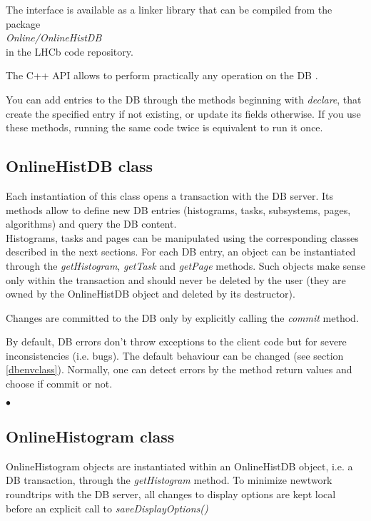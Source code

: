\documentclass{lhcbnote}
\begin{document}
The interface is available as a linker library that can be compiled from
the package \\
{\it Online/OnlineHistDB} \\
in the LHCb code repository.

The C++ API allows to perform practically any operation on the DB .

You can add entries to the DB through the methods beginning with {\it
declare}, that create the specified entry if not existing, or 
update its fields otherwise. If you use these methods, running the
same code twice is equivalent to run it once.


\subsection{OnlineHistDB class}
Each instantiation of this class opens a transaction with the DB
server. Its methods allow to define new DB entries (histograms,
tasks, subsystems, pages, algorithms) and query the DB content. \\
Histograms, tasks and pages can be manipulated using the corresponding
classes described in the next sections. For each DB entry, an object can be
instantiated through the {\it getHistogram},  {\it getTask} and {\it
getPage} methods. Such objects make sense only within the transaction
and should never be deleted by the user (they are owned by the
OnlineHistDB object and deleted by its destructor). 

Changes are committed to the DB only by explicitly calling the {\it
commit} method.

By default, DB errors don't throw exceptions to the client code but
for severe inconsistencies (i.e. bugs). The default behaviour can be
changed (see section \ref{dbenvclass}). Normally, one can detect
errors by the method return values and choose if commit or not. 


\begin{list}{$\bullet$}{}



\end{list}


\subsection{OnlineHistogram class}

OnlineHistogram objects are instantiated within an
OnlineHistDB object, i.e. a DB transaction, through the {\it
getHistogram} method. To minimize newtwork roundtrips with the DB
server, all changes to display options are kept local before an
explicit call to {\it saveDisplayOptions()}
\end{document}
